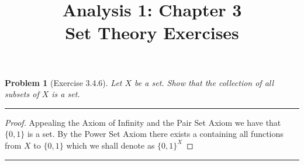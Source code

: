 \documentclass{article}
\title{\huge Analysis 1: Chapter 3 \\ \LARGE {Set Theory Exercises}}
\date{}
\newcommand{\lined}{\noindent\rule{\textwidth}{1pt}}
\newtheorem*{problem}{Problem}
\begin{document}
	\maketitle
	
	\begin{problem}[Exercise 3.4.6]
			Let $X$ be a set. Show that the collection of all subsets of $X$ is a set.
	\end{problem}
	
\lined
	\begin{proof}
		Appealing the Axiom of Infinity and the Pair Set Axiom we have that $\{0,1\}$ is a set. 
		By the Power Set Axiom there exists a containing all functions from $X$ to $\{0,1\}$ which
		we shall denote as $\{0,1\}^X$
		
	\end{proof}
\lined

	
\end{document}
